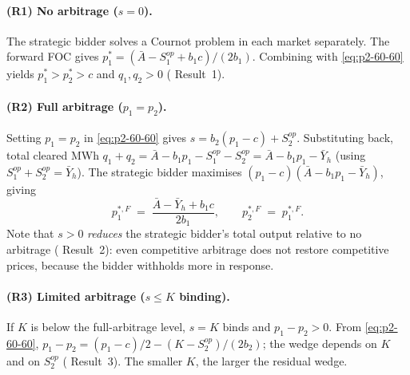 \documentclass[11pt]{article}
\begin{document}
\paragraph{(R1) No arbitrage ($s = 0$).} The strategic bidder solves a Cournot problem in each market separately. The forward FOC gives $p_1^* = (\bar A - S^{op}_1 + b_1 c)/(2 b_1)$. Combining with \eqref{eq:p2-60-60} yields $p_1^* > p_2^* > c$ and $q_1, q_2 > 0$ (\citeauthor{ito_reguant_2016} Result~1).

\paragraph{(R2) Full arbitrage ($p_1 = p_2$).} Setting $p_1 = p_2$ in \eqref{eq:p2-60-60} gives $s = b_2(p_1 - c) + S^{op}_2$. Substituting back, total cleared MWh $q_1 + q_2 = \bar A - b_1 p_1 - S^{op}_1 - S^{op}_2 = \bar A - b_1 p_1 - \bar Y_h$ (using $S^{op}_1 + S^{op}_2 = \bar Y_h$). The strategic bidder maximises $(p_1 - c)(\bar A - b_1 p_1 - \bar Y_h)$, giving
\begin{equation}
p_1^{*,F} \;=\; \frac{\bar A - \bar Y_h + b_1 c}{2 b_1}, \qquad p_2^{*,F} \;=\; p_1^{*,F}.
\label{eq:p1-60-60-full}
\end{equation}
Note that $s > 0$ \emph{reduces} the strategic bidder's total output relative to no arbitrage (\citeauthor{ito_reguant_2016} Result~2): even competitive arbitrage does not restore competitive prices, because the bidder withholds more in response.

\paragraph{(R3) Limited arbitrage ($s \le K$ binding).} If $K$ is below the full-arbitrage level, $s = K$ binds and $p_1 - p_2 > 0$. From \eqref{eq:p2-60-60}, $p_1 - p_2 = (p_1 - c)/2 - (K - S^{op}_2)/(2 b_2)$; the wedge depends on $K$ and on $S^{op}_2$ (\citeauthor{ito_reguant_2016} Result~3). The smaller $K$, the larger the residual wedge.
\end{document}
